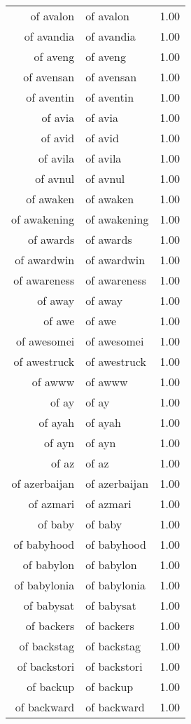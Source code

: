 \begin{table}[ht]
\begin{tabular}{rlr}
  of avalon & of avalon & 1.00 \\ 
  of avandia & of avandia & 1.00 \\ 
  of aveng & of aveng & 1.00 \\ 
  of avensan & of avensan & 1.00 \\ 
  of aventin & of aventin & 1.00 \\ 
  of avia & of avia & 1.00 \\ 
  of avid & of avid & 1.00 \\ 
  of avila & of avila & 1.00 \\ 
  of avnul & of avnul & 1.00 \\ 
  of awaken & of awaken & 1.00 \\ 
  of awakening & of awakening & 1.00 \\ 
  of awards & of awards & 1.00 \\ 
  of awardwin & of awardwin & 1.00 \\ 
  of awareness & of awareness & 1.00 \\ 
  of away & of away & 1.00 \\ 
  of awe & of awe & 1.00 \\ 
  of awesomei & of awesomei & 1.00 \\ 
  of awestruck & of awestruck & 1.00 \\ 
  of awww & of awww & 1.00 \\ 
  of ay & of ay & 1.00 \\ 
  of ayah & of ayah & 1.00 \\ 
  of ayn & of ayn & 1.00 \\ 
  of az & of az & 1.00 \\ 
  of azerbaijan & of azerbaijan & 1.00 \\ 
  of azmari & of azmari & 1.00 \\ 
  of baby & of baby & 1.00 \\ 
  of babyhood & of babyhood & 1.00 \\ 
  of babylon & of babylon & 1.00 \\ 
  of babylonia & of babylonia & 1.00 \\ 
  of babysat & of babysat & 1.00 \\ 
  of backers & of backers & 1.00 \\ 
  of backstag & of backstag & 1.00 \\ 
  of backstori & of backstori & 1.00 \\ 
  of backup & of backup & 1.00 \\ 
  of backward & of backward & 1.00 \\ 

\end{tabular}
\end{table}

